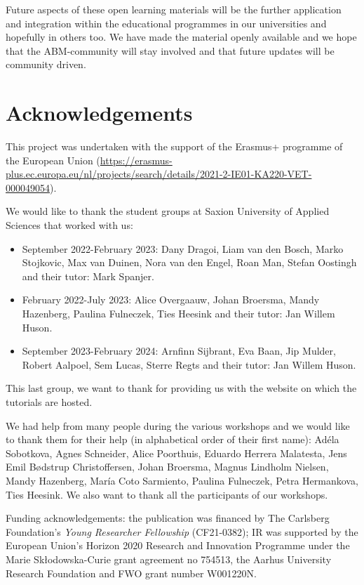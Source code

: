 \documentclass[
]{article}
\begin{document}
Future aspects of these open learning materials will be the further application and integration within the educational programmes in our universities and hopefully in others too. We have made the material openly available and we hope that the ABM-community will stay involved and that future updates will be community driven.

\hypertarget{acknowledgements}{%
\section{Acknowledgements}\label{acknowledgements}}

This project was undertaken with the support of the Erasmus+ programme of the European Union (\url{https://erasmus-plus.ec.europa.eu/nl/projects/search/details/2021-2-IE01-KA220-VET-000049054}).

We would like to thank the student groups at Saxion University of Applied Sciences that worked with us:

\begin{itemize}
\item
  September 2022-February 2023: Dany Dragoi, Liam van den Bosch, Marko Stojkovic, Max van Duinen, Nora van den Engel, Roan Man, Stefan Oostingh and their tutor: Mark Spanjer.
\item
  February 2022-July 2023: Alice Overgaauw, Johan Broersma, Mandy Hazenberg, Paulina Fulneczek, Ties Heesink and their tutor: Jan Willem Huson.
\item
  September 2023-February 2024: Arnfinn Sijbrant, Eva Baan, Jip Mulder, Robert Aalpoel, Sem Lucas, Sterre Regts and their tutor: Jan Willem Huson.
\end{itemize}

This last group, we want to thank for providing us with the website on which the tutorials are hosted.

We had help from many people during the various workshops and we would like to thank them for their help (in alphabetical order of their first name): Adéla Sobotkova, Agnes Schneider, Alice Poorthuis, Eduardo Herrera Malatesta, Jens Emil Bødstrup Christoffersen, Johan Broersma, Magnus Lindholm Nielsen, Mandy Hazenberg, María Coto Sarmiento, Paulina Fulneczek, Petra Hermankova, Ties Heesink. We also want to thank all the participants of our workshops.

Funding acknowledgements: the publication was financed by The Carlsberg Foundation's \emph{Young Researcher Fellowship} (CF21-0382); IR was supported by the European Union's Horizon 2020 Research and Innovation Programme under the Marie Skłodowska-Curie grant agreement no 754513, the Aarhus University Research Foundation and FWO grant number W001220N.
\end{document}
